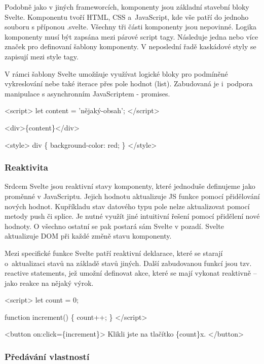 Podobně jako v jiných frameworcích, komponenty jsou základní stavební bloky Svelte. Komponentu tvoří HTML, CSS a~JavaScript, kde vše patří do jednoho souboru s příponou .svelte. 
Všechny tři části komponenty jsou nepovinné. Logika komponenty musí být zapsána mezi párové script tagy. Následuje jedna nebo více značek pro definovaní šablony komponenty. 
V neposlední řadě kaskádové styly se zapisují mezi style tagy.

V rámci šablony Svelte umožňuje využívat logické bloky pro podmíněné vykreslování nebe také iterace přes pole hodnot (list). 
Zabudovaná je i~podpora manipulace s asynchronním JavaScriptem - promises.\cite{svelte}

\begin{prog}
<script>
  let content = 'nějaký-obsah';
</script>

<div>\{content\}</div>
  
<style>
  div \{
    background-color: red;
  \}
</style>
\end{prog}

\subsubsection{Reaktivita}

Srdcem Svelte jsou reaktivní stavy komponenty, které jednoduše definujeme jako proměnné v JavaScriptu. Jejich hodnotu aktualizuje JS funkce pomocí přidělování nových hodnot. 
Kupříkladu stav datového typu pole nelze aktualizovat pomocí metody push či splice. Je nutné využít jiné intuitivní řešení pomocí přidělení nové hodnoty.
O všechno ostatní se pak postará sám Svelte v pozadí. Svelte aktualizuje DOM při každé změně stavu komponenty. 

Mezi specifické funkce Svelte patří reaktivní deklarace, které se starají o~aktualizaci stavů na základě stavů jiných. 
Další zabudovanou funkcí jsou tzv. reactive statements, jež umožní definovat akce, které se mají vykonat reaktivně -- jako reakce na nějaký výrok.\cite{sveltehandbook,svelte}

\begin{prog}
<script>
  let count = 0;

  function increment() \{
    count++;
  \}
</script>

<button on:click=\{increment\}>
  Klikli jste na tlačítko \{count\}x.
</button>
\end{prog}

\subsubsection{Předávání vlastností}

